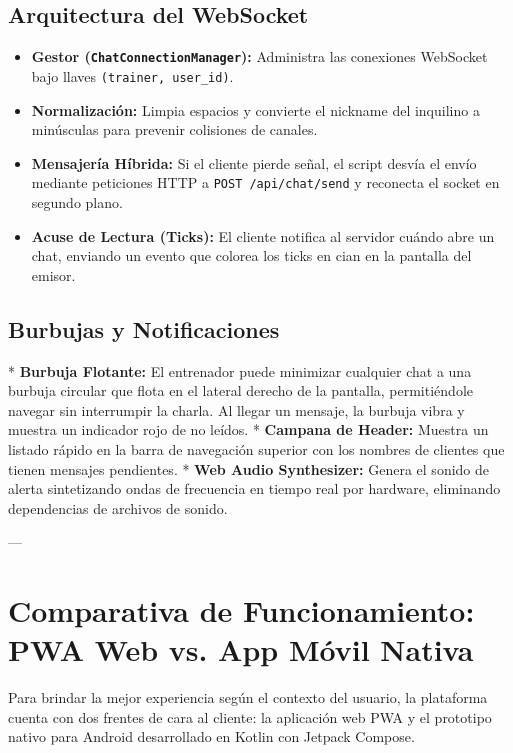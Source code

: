 \documentclass[11pt]{article}
\begin{document}
\subsection{Arquitectura del WebSocket}
\begin{itemize}
    \item \textbf{Gestor (\texttt{ChatConnectionManager}):} Administra las conexiones WebSocket bajo llaves \texttt{(trainer, user\_id)}.
    \item \textbf{Normalización:} Limpia espacios y convierte el nickname del inquilino a minúsculas para prevenir colisiones de canales.
    \item \textbf{Mensajería Híbrida:} Si el cliente pierde señal, el script desvía el envío mediante peticiones HTTP a \texttt{POST /api/chat/send} y reconecta el socket en segundo plano.
    \item \textbf{Acuse de Lectura (Ticks):} El cliente notifica al servidor cuándo abre un chat, enviando un evento que colorea los ticks en cian en la pantalla del emisor.
\end{itemize}

\subsection{Burbujas y Notificaciones}
* \textbf{Burbuja Flotante:} El entrenador puede minimizar cualquier chat a una burbuja circular que flota en el lateral derecho de la pantalla, permitiéndole navegar sin interrumpir la charla. Al llegar un mensaje, la burbuja vibra y muestra un indicador rojo de no leídos.
* \textbf{Campana de Header:} Muestra un listado rápido en la barra de navegación superior con los nombres de clientes que tienen mensajes pendientes.
* \textbf{Web Audio Synthesizer:} Genera el sonido de alerta sintetizando ondas de frecuencia en tiempo real por hardware, eliminando dependencias de archivos de sonido.

---

\section{Comparativa de Funcionamiento: PWA Web vs. App Móvil Nativa}
Para brindar la mejor experiencia según el contexto del usuario, la plataforma cuenta con dos frentes de cara al cliente: la aplicación web PWA y el prototipo nativo para Android desarrollado en Kotlin con Jetpack Compose.
\end{document}
